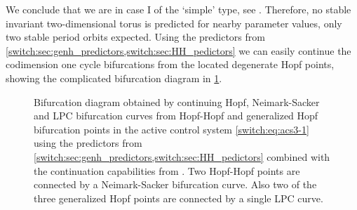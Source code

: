 We conclude that we are in case I of the `simple' type, see \cite[page 360]{Kuznetsov2004}. Therefore, no stable invariant two-dimensional torus is predicted for nearby parameter values, only two stable period orbits expected. Using the predictors from \cref{switch:sec:genh_predictors,switch:sec:HH_pedictors} we can easily continue the codimension one cycle bifurcations from the located degenerate Hopf points, showing the complicated bifurcation diagram in \cref{switch:fig:acs_unfolding}.
%
\begin{figure}[ht]
\noindent \begin{centering}
\par\end{centering}
\caption{\label{switch:fig:acs_unfolding} Bifurcation diagram obtained by continuing Hopf, Neimark-Sacker and LPC bifurcation curves from Hopf-Hopf and generalized Hopf bifurcation points in the active control system \cref{switch:eq:acs3-1} using the predictors from \cref{switch:sec:genh_predictors,switch:sec:HH_pedictors} combined with the continuation capabilities from \DDEBIFTOOL. Two Hopf-Hopf points are connected by a Neimark-Sacker bifurcation curve. Also two of the three generalized Hopf points are connected by a single LPC curve.}
\end{figure}


